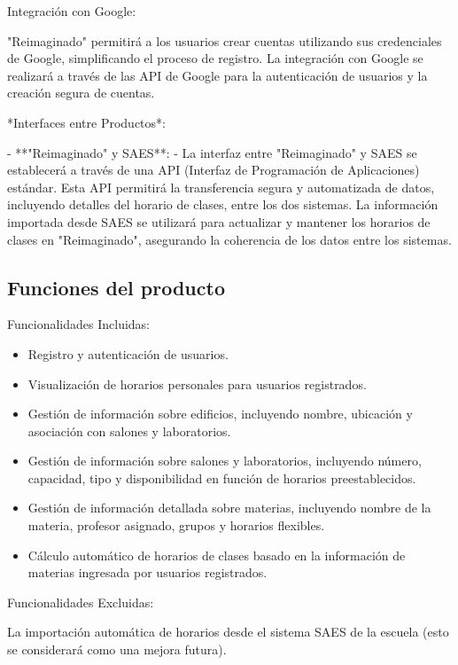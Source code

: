    Integración con Google:
   
   "Reimaginado" permitirá a los usuarios crear cuentas utilizando sus credenciales de Google, simplificando el proceso de registro. La integración con Google se realizará a través de las API de Google para la autenticación de usuarios y la creación segura de cuentas.
   
*Interfaces entre Productos*:

- **"Reimaginado" y SAES**:
  - La interfaz entre "Reimaginado" y SAES se establecerá a través de una API (Interfaz de Programación de Aplicaciones) estándar. Esta API permitirá la transferencia segura y automatizada de datos, incluyendo detalles del horario de clases, entre los dos sistemas. La información importada desde SAES se utilizará para actualizar y mantener los horarios de clases en "Reimaginado", asegurando la coherencia de los datos entre los sistemas.


\subsection{Funciones del producto}
Funcionalidades Incluidas:

\begin{itemize}
        \item Registro y autenticación de usuarios.
        \item Visualización de horarios personales para usuarios registrados.
        \item Gestión de información sobre edificios, incluyendo nombre, ubicación y asociación con salones y laboratorios.

        \item Gestión de información sobre salones y laboratorios, incluyendo número, capacidad, tipo y disponibilidad en función de horarios preestablecidos.

        \item Gestión de información detallada sobre materias, incluyendo nombre de la materia, profesor asignado, grupos y horarios flexibles.

        \item Cálculo automático de horarios de clases basado en la información de materias ingresada por usuarios registrados.
\end{itemize}


Funcionalidades Excluidas:

La importación automática de horarios desde el sistema SAES de la escuela (esto se considerará como una mejora futura).


